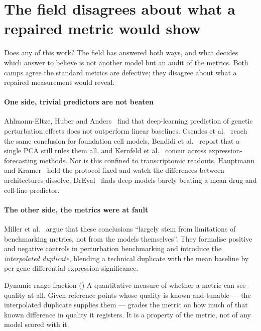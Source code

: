 \section{The field disagrees about what a repaired metric would show}
\label{sec:lit-dispute}
\framedecl{-}

\begin{question}
Does any of this work? The field has answered both ways, and what decides which
answer to believe is not another model but an audit of the metrics. Both camps
agree the standard metrics are defective; they disagree about what a repaired
measurement would reveal.
\end{question}

\paragraph{One side, trivial predictors are not beaten}
Ahlmann-Eltze, Huber and Anders~\cite{ahlmanneltze} find that deep-learning
prediction of genetic perturbation effects does not outperform linear baselines.
Csendes et al.~\cite{csendes} reach the same conclusion for foundation cell
models, Bendidi et al.~\cite{bendidi} report that a single PCA still rules them
all, and Kernfeld et al.~\cite{kernfeld} concur across expression-forecasting
methods. Nor is this confined to transcriptomic readouts. Hauptmann and
Kramer~\cite{hauptmann} hold the protocol fixed and watch the differences between
architectures dissolve; DrEval~\cite{dreval} finds deep models barely beating a
mean drug and cell-line predictor.

\paragraph{The other side, the metrics were at fault} Miller et
al.~\cite{miller} argue that these conclusions ``largely stem from limitations of
benchmarking metrics, not from the models themselves''. They formalise positive
and negative controls in perturbation benchmarking and introduce the
\emph{interpolated duplicate}, blending a technical duplicate with the mean
baseline by per-gene differential-expression
significance.

\begin{defn}{Dynamic range fraction (\DRF)}
A quantitative measure of whether a metric can see quality at all. Given
reference points whose quality is known and tunable --- the interpolated
duplicate supplies them --- \DRF{} grades the metric on how much of that known
difference in quality it registers. It is a property of the metric, not of any
model scored with it.
\end{defn}

